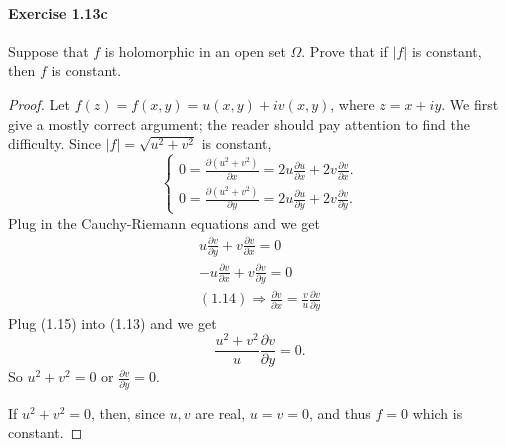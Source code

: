\documentclass{article}
\begin{document}
\paragraph{Exercise 1.13c} Suppose that $f$ is holomorphic in an open set $\Omega$. Prove that if $|f|$ is constant, then $f$ is constant.
\begin{proof}
Let $f(z)=f(x, y)=u(x, y)+i v(x, y)$, where $z=x+i y$.
We first give a mostly correct argument; the reader should pay attention to find the difficulty. Since $|f|=\sqrt{u^2+v^2}$ is constant,
$$
\left\{\begin{array}{l}
0=\frac{\partial\left(u^2+v^2\right)}{\partial x}=2 u \frac{\partial u}{\partial x}+2 v \frac{\partial v}{\partial x} . \\
0=\frac{\partial\left(u^2+v^2\right)}{\partial y}=2 u \frac{\partial u}{\partial y}+2 v \frac{\partial v}{\partial y} .
\end{array}\right.
$$
Plug in the Cauchy-Riemann equations and we get
$$
\begin{gathered}
u \frac{\partial v}{\partial y}+v \frac{\partial v}{\partial x}=0 \\
-u \frac{\partial v}{\partial x}+v \frac{\partial v}{\partial y}=0 \\
(1.14) \Rightarrow \frac{\partial v}{\partial x}=\frac{v}{u} \frac{\partial v}{\partial y}
\end{gathered}
$$
Plug (1.15) into (1.13) and we get
$$
\frac{u^2+v^2}{u} \frac{\partial v}{\partial y}=0 .
$$
So $u^2+v^2=0$ or $\frac{\partial v}{\partial y}=0$.

If $u^2+v^2=0$, then, since $u, v$ are real, $u=v=0$, and thus $f=0$ which is constant.


\end{proof}
\end{document}
